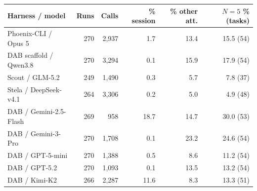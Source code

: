 \begin{tabular}{@{}lrrrrr@{}}
\toprule
Harness / model & Runs & Calls & \% session & \% other att. & $N{=}5$ \% (tasks) \\
\midrule
Phoenix-CLI / Opus 5 & 270 & 2,937 & 1.7 & 13.4 & 15.5 (54) \\
DAB scaffold / Qwen3.8 & 270 & 3,294 & 0.1 & 15.9 & 17.9 (54) \\
Scout / GLM-5.2 & 249 & 1,490 & 0.3 & 5.7 & 7.8 (37) \\
Stela / DeepSeek-v4.1 & 264 & 3,306 & 0.2 & 5.0 & 4.9 (48) \\
\midrule
DAB / Gemini-2.5-Flash & 269 & 958 & 18.7 & 14.7 & 30.0 (53) \\
DAB / Gemini-3-Pro & 270 & 1,708 & 0.1 & 23.2 & 24.6 (54) \\
DAB / GPT-5-mini & 270 & 1,388 & 0.5 & 8.6 & 11.2 (54) \\
DAB / GPT-5.2 & 270 & 1,093 & 0.1 & 13.5 & 13.2 (54) \\
DAB / Kimi-K2 & 266 & 2,287 & 11.6 & 8.3 & 13.3 (51) \\
\bottomrule
\end{tabular}
